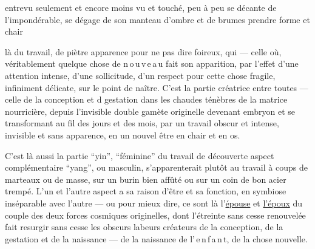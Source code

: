entrevu seulement et encore moins vu et touché,  peu à peu se
décante de l'impondérable, se dégage de son manteau d'ombre et de brumes
 prendre forme et chair\inserted{\ldots}

là du travail,
de piètre apparence pour ne pas dire foireux, qui
--- celle où, véritablement quelque chose de n\,o\,u\,v\,e\,a\,u fait son apparition,
par l'effet d'une attention intense, d'une sollicitude, d'un respect pour cette chose fragile,
infiniment délicate, sur le point de naître. C'est la partie créatrice entre toutes ---
celle de la conception et d gestation
 dans les chaudes ténèbres de la matrice nourricière,
 depuis l'invisible double gamète 
originelle devenant embryon et se transformant au fil des jours et des mois,
par un travail obscur et intense, invisible et sans apparence, en un nouvel être en chair et en os.

C'est là aussi la partie ``yin'', ``féminine\deleted{\unsure{,}}'' du travail de découverte\deleted{---}
aspect complémentaire ``yang'', ou masculin,
s'apparenterait plutôt  au travail à coups de marteaux ou de masse,
sur un burin bien affûté ou sur un coin de bon acier trempé.
L'un et l'autre aspect a sa raison d'être et sa fonction, en symbiose inséparable
avec l'autre --- ou pour mieux dire, ce sont là l'\uline{épouse} et \uline{l'époux}
du couple des deux forces cosmiques originelles, dont l'étreinte
sans cesse renouvelée fait resurgir sans cesse les obscurs labeurs créateurs de la conception,
de la gestation et de la naissance --- de la naissance de l'\,e\,n\,f\,a\,n\,t, de la chose nouvelle.

